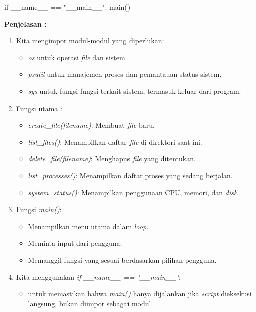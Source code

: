 \documentclass[12pt]{article}
\begin{document}
\begin{enumerate}
\begin{python}
if __name__ == "__main__":
    main()
    \end{python}
    
    \textbf{Penjelasan :}
    \begin{enumerate}
        \item Kita mengimpor modul-modul yang diperlukan:
            \begin{itemize}
                \item \textit{os} untuk operasi \textit{file} dan sistem.
                
                \item \textit{psutil} untuk manajemen proses dan pemantauan status sistem.
                
                \item \textit{sys} untuk fungsi-fungsi terkait sistem, termasuk keluar dari program.
            \end{itemize}
            
        \item Fungsi utama :
            \begin{itemize}
                \item \textit{create\_file(filename)}: Membuat \textit{file} baru.
                
                \item \textit{list\_files()}: Menampilkan daftar \textit{file} di direktori saat ini.
                
                \item \textit{delete\_file(filename)}: Menghapus \textit{file} yang ditentukan.
                
                \item \textit{list\_processes()}: Menampilkan daftar proses yang sedang berjalan.
                
                \item \textit{system\_status()}: Menampilkan penggunaan CPU, memori, dan \textit{disk}.
            \end{itemize}
            
        \item Fungsi \textit{main()}:
            \begin{itemize}
                \item Menampilkan menu utama dalam \textit{loop}.
                \item Meminta input dari pengguna.
                \item Memanggil fungsi yang sesuai berdasarkan pilihan pengguna.
            \end{itemize}
            
        \item Kita menggunakan \textit{if \_\_name\_\_ == "\_\_main\_\_"}: 
            \begin{itemize}
                \item untuk memastikan bahwa \textit{main()} hanya dijalankan jika \textit{script} dieksekusi langsung, bukan diimpor sebagai modul.
            \end{itemize}
    \end{enumerate}
\end{enumerate}
\end{document}
